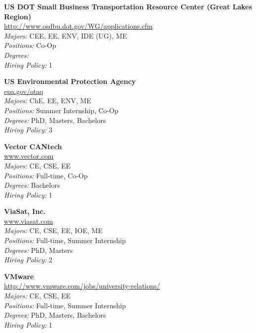 \documentclass[twoside]{article}
\begin{document}
\begin{center}
\begin{multicols}{3}
\begin{minipage}{.9\columnwidth}{\Large\bf US DOT Small Business Transportation Resource Center (Great Lakes Region) }\\
	\url{http://www.osdbu.dot.gov/WG/applications.cfm}\\
	\emph{Majors:} CEE, EE, ENV, IDE (UG), ME\\
	\emph{Positions:} Co-Op\\
	\emph{Degrees:} \\
	\emph{Hiring Policy:} 1\\
\end{minipage}
 
\begin{minipage}{.9\columnwidth}{\Large\bf US Environmental Protection Agency }\\
	\url{epa.gov/otaq}\\
	\emph{Majors:} ChE, EE, ENV, ME\\
	\emph{Positions:} Summer Internship, Co-Op\\
	\emph{Degrees:} PhD, Masters, Bachelors\\
	\emph{Hiring Policy:} 3\\
\end{minipage}
 
\begin{minipage}{.9\columnwidth}{\Large\bf Vector CANtech }\\
	\url{www.vector.com}\\
	\emph{Majors:} CE, CSE, EE\\
	\emph{Positions:} Full-time, Co-Op\\
	\emph{Degrees:} Bachelors\\
	\emph{Hiring Policy:} 1\\
\end{minipage}
 
\begin{minipage}{.9\columnwidth}{\Large\bf ViaSat, Inc. }\\
	\url{www.viasat.com}\\
	\emph{Majors:} CE, CSE, EE, IOE, ME\\
	\emph{Positions:} Full-time, Summer Internship\\
	\emph{Degrees:} PhD, Masters\\
	\emph{Hiring Policy:} 2\\
\end{minipage}
 
\begin{minipage}{.9\columnwidth}{\Large\bf VMware }\\
	\url{http://www.vmware.com/jobs/university-relations/}\\
	\emph{Majors:} CE, CSE, EE\\
	\emph{Positions:} Full-time, Summer Internship\\
	\emph{Degrees:} PhD, Masters, Bachelors\\
	\emph{Hiring Policy:} 1\\
\end{minipage}
 

\end{multicols}
\end{center}
\end{document}

